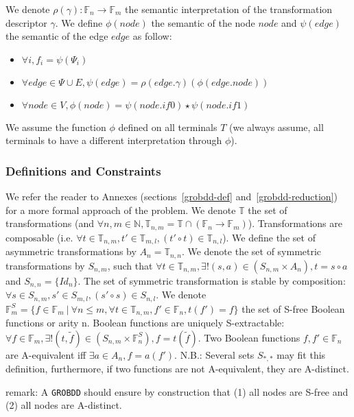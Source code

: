 \documentclass[a4paper,10pt]{article}
\newcommand{\N}{\mathbb{N}}%
\newcommand{\F}{\mathbb{F}}
\newcommand{\T}{\mathbb{T}}
\newcommand{\GroBdd}{\texttt{GROBDD}}
\begin{document}
We denote $\rho(\gamma) : \F_n \longrightarrow \F_m$ the semantic interpretation of the transformation descriptor $\gamma$.
We define $\phi(node)$ the semantic of the node $node$ and $\psi(edge)$ the semantic of the edge $edge$ as follow:\begin{itemize}
\item $\forall i, f_i = \psi(\Psi_i)$
\item $\forall edge \in \Psi \cup E, \psi(edge) = \rho(edge.\gamma)(\phi(edge.\mathit{node}))$
\item $\forall node \in V, \phi(node) = \psi(node.\mathit{if0}) \star \psi(node.\mathit{if1})$
\end{itemize}
We assume the function $\phi$ defined on all terminals $T$ (we always assume, all terminals to have a different interpretation through $\phi$).

\subsubsection{Definitions and Constraints}

We refer the reader to Annexes (sections~\ref{grobdd-def} and~\ref{grobdd-reduction}) for a more formal approach of the problem.
We denote $\T$ the set of transformations (and $\forall n, m\in\N, \T_{n, m} = \T \cap (\F_n \longrightarrow \F_m)$).
Transformations are composable (i.e. $\forall t\in\T_{n, m}, t'\in\T_{m ,l}, (t' \circ t) \in \T_{n, l}$).
We define the set of asymmetric transformations by $A_n = \T_{n, n}$.
We denote the set of symmetric transformations by $S_{n, m}$, such that $\forall t\in\T_{n, m}, \exists!(s, a)\in(S_{n, m}\times A_n), t = s \circ a$ and $S_{n, n} = \{Id_n\}$.
The set of symmetric transformation is stable by composition: $\forall s\in S_{n, m}, s'\in S_{m ,l}, (s' \circ s) \in S_{n, l}$.
We denote $\F^S_m = \{f\in\F_m~|~\forall n \leq m, \forall t\in\T_{n, m}, f'\in\F_n, t(f') = f\}$ the set of S-free Boolean functions or arity n.
Boolean functions are uniquely S-extractable: $\forall f\in\F_m, \exists! (t, \tilde{f})\in \left( S_{n, m} \times \F^S_n \right), f = t(\tilde{f})$.
Two Boolean functions $f, f'\in\F_n$ are A-equivalent iff $\exists a\in A_n, f=a(f')$.
N.B.: Several sets $S_{*, *}$ may fit this definition, furthermore, if two functions are not A-equivalent, they are A-distinct.

remark: A \GroBdd{} should ensure by construction that (1) all nodes are S-free and (2) all nodes are A-distinct.
\end{document}

